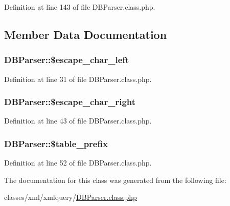 Definition at line 143 of file D\+B\+Parser.\+class.\+php.



\subsection{Member Data Documentation}
\subsubsection[{\texorpdfstring{\$escape\+\_\+char\+\_\+left}{$escape_char_left}}]{\setlength{\rightskip}{0pt plus 5cm}D\+B\+Parser\+::\$escape\+\_\+char\+\_\+left}\hypertarget{classDBParser_a69d128e325c7eb18cdc50d6183f5564f}{}\label{classDBParser_a69d128e325c7eb18cdc50d6183f5564f}


Definition at line 31 of file D\+B\+Parser.\+class.\+php.

\subsubsection[{\texorpdfstring{\$escape\+\_\+char\+\_\+right}{$escape_char_right}}]{\setlength{\rightskip}{0pt plus 5cm}D\+B\+Parser\+::\$escape\+\_\+char\+\_\+right}\hypertarget{classDBParser_acb291f115d0e864a5a5774ebcf091eeb}{}\label{classDBParser_acb291f115d0e864a5a5774ebcf091eeb}


Definition at line 43 of file D\+B\+Parser.\+class.\+php.

\subsubsection[{\texorpdfstring{\$table\+\_\+prefix}{$table_prefix}}]{\setlength{\rightskip}{0pt plus 5cm}D\+B\+Parser\+::\$table\+\_\+prefix}\hypertarget{classDBParser_aecad815ff642d9c918e97747d638dbf0}{}\label{classDBParser_aecad815ff642d9c918e97747d638dbf0}


Definition at line 52 of file D\+B\+Parser.\+class.\+php.



The documentation for this class was generated from the following file\+:\begin{DoxyCompactItemize}
\item 
classes/xml/xmlquery/\hyperlink{DBParser_8class_8php}{D\+B\+Parser.\+class.\+php}\end{DoxyCompactItemize}
